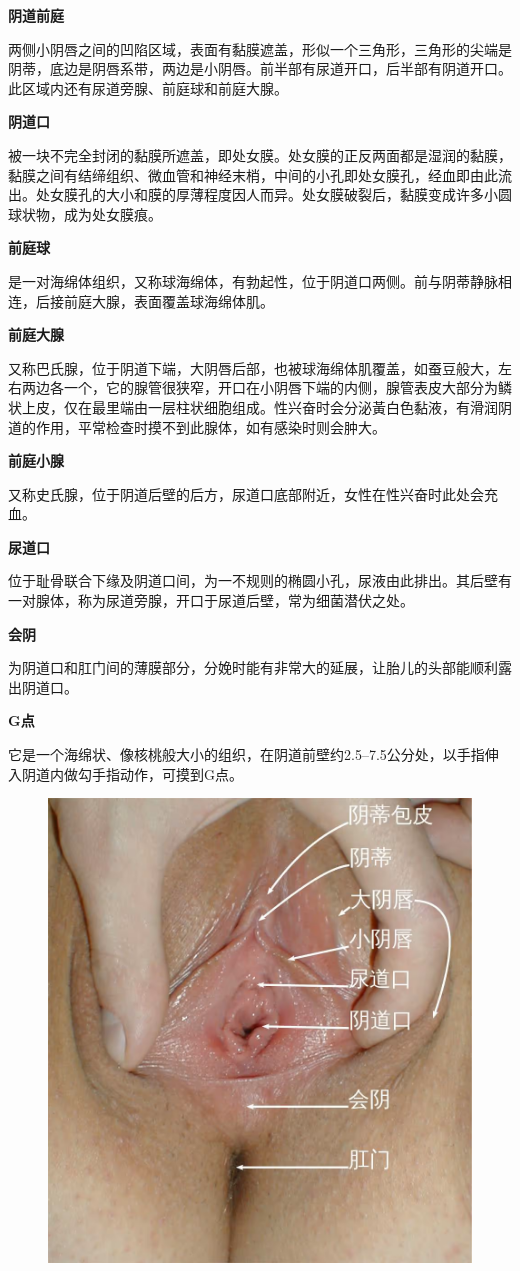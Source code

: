 \documentclass[12pt,UTF8]{ctexbook}
\begin{document}
\textbf{阴道前庭}

两侧小阴唇之间的凹陷区域，表面有黏膜遮盖，形似一个三角形，三角形的尖端是阴蒂，底边是阴唇系带，两边是小阴唇。前半部有尿道开口，后半部有阴道开口。此区域内还有尿道旁腺、前庭球和前庭大腺。

\textbf{阴道口}

被一块不完全封闭的黏膜所遮盖，即处女膜。处女膜的正反两面都是湿润的黏膜，黏膜之间有结缔组织、微血管和神经末梢，中间的小孔即处女膜孔，经血即由此流出。处女膜孔的大小和膜的厚薄程度因人而异。处女膜破裂后，黏膜变成许多小圆球状物，成为处女膜痕。

\textbf{前庭球}

是一对海绵体组织，又称球海绵体，有勃起性，位于阴道口两侧。前与阴蒂静脉相连，后接前庭大腺，表面覆盖球海绵体肌。

\textbf{前庭大腺}

又称巴氏腺，位于阴道下端，大阴唇后部，也被球海绵体肌覆盖，如蚕豆般大，左右两边各一个，它的腺管很狭窄，开口在小阴唇下端的内侧，腺管表皮大部分为鳞状上皮，仅在最里端由一层柱状细胞组成。性兴奋时会分泌黃白色黏液，有滑润阴道的作用，平常检查时摸不到此腺体，如有感染时则会肿大。

\textbf{前庭小腺}

又称史氏腺，位于阴道后壁的后方，尿道口底部附近，女性在性兴奋时此处会充血。

\textbf{尿道口}

位于耻骨联合下缘及阴道口间，为一不规则的椭圆小孔，尿液由此排出。其后壁有一对腺体，称为尿道旁腺，开口于尿道后壁，常为细菌潜伏之处。

\textbf{会阴}

为阴道口和肛门间的薄膜部分，分娩时能有非常大的延展，让胎儿的头部能顺利露出阴道口。

\textbf{G点}

它是一个海绵状、像核桃般大小的组织，在阴道前壁约2.5--7.5公分处，以手指伸入阴道内做勾手指动作，可摸到G点。

\begin{figure}[htbp]
	\centering
	\includegraphics[width=0.7\linewidth]{1}
	\caption{}
	\label{fig:1}
\end{figure}
\end{document}

